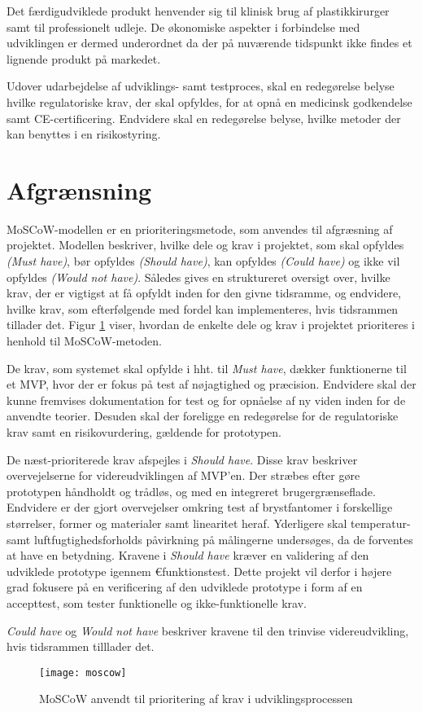 Det færdigudviklede produkt henvender sig til klinisk brug af plastikkirurger samt til professionelt udleje. De økonomiske aspekter i forbindelse med udviklingen er dermed underordnet da der på nuværende tidspunkt ikke findes et lignende produkt på markedet.   

Udover udarbejdelse af udviklings- samt testproces, skal en redegørelse belyse hvilke regulatoriske krav, der skal opfyldes, for at opnå en medicinsk godkendelse samt CE-certificering. Endvidere skal en redegørelse belyse, hvilke metoder der kan benyttes i en risikostyring.

\section{Afgrænsning}
MoSCoW-modellen er en prioriteringsmetode, som anvendes til afgræsning af projektet. Modellen beskriver, hvilke dele og krav i projektet, som skal opfyldes \textit{(Must have)}, bør opfyldes \textit{(Should have)}, kan opfyldes \textit{(Could have)} og ikke vil opfyldes \textit{(Would not have)}. Således gives en struktureret oversigt over, hvilke krav, der er vigtigst at få opfyldt inden for den givne tidsramme, og endvidere, hvilke krav, som efterfølgende med fordel kan implementeres, hvis tidsrammen tillader det. Figur \ref{fig:moscow} viser, hvordan de enkelte dele og krav i projektet prioriteres i henhold til MoSCoW-metoden.

De krav, som systemet skal opfylde i hht. til \textit{Must have}, dækker funktionerne til et MVP, hvor der er fokus på test af nøjagtighed og præcision. Endvidere skal der kunne fremvises dokumentation for test og for opnåelse af ny viden inden for de anvendte teorier. Desuden skal der foreligge en redegørelse for de regulatoriske krav samt en risikovurdering, gældende for prototypen.

De næst-prioriterede krav afspejles i \textit{Should have}. Disse krav beskriver overvejelserne for videreudviklingen af MVP'en. Der stræbes efter gøre prototypen håndholdt og trådløs, og med en integreret  brugergrænseflade. Endvidere er der gjort overvejelser omkring test af brystfantomer i forskellige størrelser, former og materialer samt linearitet heraf. Yderligere skal temperatur- samt luftfugtighedsforholds påvirkning på målingerne undersøges, da de forventes at have en  betydning. 
Kravene i \textit{Should have} kræver en validering af den udviklede prototype igennem €funktionstest. Dette projekt vil derfor i højere grad fokusere på en verificering af den udviklede prototype i form af en accepttest, som tester funktionelle og ikke-funktionelle krav. 

\textit{Could have} og \textit{Would not have} beskriver kravene til den trinvise videreudvikling, hvis tidsrammen tilllader det. 

\begin{figure}[]
\texttt{[image: moscow]}
\caption{MoSCoW anvendt til prioritering af krav i udviklingsprocessen}
\label{fig:moscow}
\end{figure}


